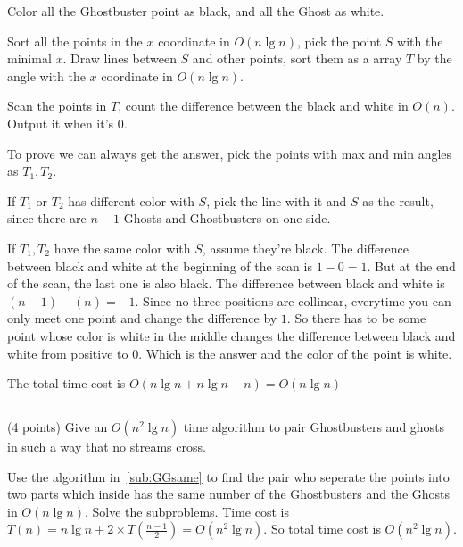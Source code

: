 \documentclass[paper=a4, fontsize=11pt]{scrartcl} %
\begin{document}
Color all the Ghostbuster point as black, and all the Ghost as
white.

Sort all the points in the $x$ coordinate in $O(n\lg{n})$, pick the
point $S$ with the minimal $x$.
Draw lines between $S$ and other points, sort them as a array $T$ by
the angle with the $x$ coordinate in $O(n\lg{n})$.

Scan the points in $T$, count the difference between the black and
white in $O(n)$. Output it when it's $0$.

To prove we can always get the answer,
pick the points with max and min angles as $T_1, T_2$.

If $T_1$ or $T_2$ has different color with $S$, pick the line with
it and $S$ as the result, since there are $n-1$ Ghosts and
Ghostbusters on one side.

If $T_1, T_2$ have the same color with $S$, assume they're black.
The difference between black and white at the beginning of the scan is
$1-0=1$.
But at the end of the scan, the last one is also black. The
difference between black and white is $(n-1)-(n)=-1$.
Since no three positions are collinear, everytime you can only meet
one point and change the difference by $1$.
So there has to be some point whose color is white in the middle
changes the difference between black and white from positive to
$0$. Which is the answer and the color of the point is white.

The total time cost is $O(n\lg{n}+n\lg{n}+n)=O(n\lg{n})$

\subsection{}

\begin{fancyquotes}
  (4 points) Give an $O(n^2\lg{n})$ time algorithm to pair
  Ghostbusters and ghosts in such a way that no streams cross.
\end{fancyquotes}

Use the algorithm in~\ref{sub:GGsame} to find the pair who seperate
the points into two parts which inside has the same number of the
Ghostbusters and the Ghosts in $O(n\lg{n})$. Solve the subproblems.
Time cost is $T(n) = n\lg{n}+2\times T(\frac{n-1}{2}) = O(n^2\lg{n})$.
So total time cost is $O(n^2\lg{n})$.

\pagebreak


\end{document}
